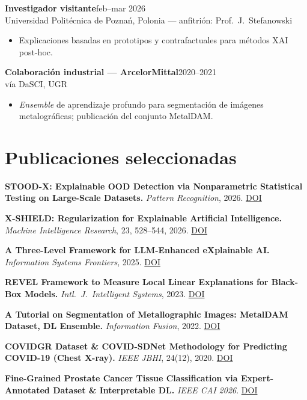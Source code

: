 \documentclass[10pt,a4paper]{article}
\newcommand{\job}[2]{\textbf{\color{ink}#1}\hfill{\footnotesize\color{muted}#2}}
\newcommand{\where}[1]{{\footnotesize\color{muted}#1}}
\begin{document}
\vspace{0.2em}
\job{Investigador visitante}{feb--mar 2026}\\
\where{Universidad Politécnica de Poznań, Polonia --- anfitrión: Prof.~J.~Stefanowski}
\begin{itemize}
  \item Explicaciones basadas en prototipos y contrafactuales para métodos XAI post-hoc.
\end{itemize}

\vspace{0.2em}
\job{Colaboración industrial --- ArcelorMittal}{2020--2021}\\
\where{vía DaSCI, UGR}
\begin{itemize}
  \item \textit{Ensemble} de aprendizaje profundo para segmentación de imágenes metalográficas; publicación del conjunto MetalDAM.
\end{itemize}

\section*{Publicaciones seleccionadas}

{\footnotesize
\textbf{STOOD-X: Explainable OOD Detection via Nonparametric Statistical Testing on Large-Scale Datasets.} \textit{Pattern Recognition}, 2026. \href{https://doi.org/10.1016/j.patcog.2026.113254}{DOI}\par\vspace{0.25em}
\textbf{X-SHIELD: Regularization for Explainable Artificial Intelligence.} \textit{Machine Intelligence Research}, 23, 528--544, 2026. \href{https://doi.org/10.1007/s11633-025-1576-y}{DOI}\par\vspace{0.25em}
\textbf{A Three-Level Framework for LLM-Enhanced eXplainable AI.} \textit{Information Systems Frontiers}, 2025. \href{https://doi.org/10.1007/s10796-025-10668-1}{DOI}\par\vspace{0.25em}
\textbf{REVEL Framework to Measure Local Linear Explanations for Black-Box Models.} \textit{Intl.~J.~Intelligent Systems}, 2023. \href{https://doi.org/10.1155/2023/8068569}{DOI}\par\vspace{0.25em}
\textbf{A Tutorial on Segmentation of Metallographic Images: MetalDAM Dataset, DL Ensemble.} \textit{Information Fusion}, 2022. \href{https://doi.org/10.1016/j.inffus.2021.09.018}{DOI}\par\vspace{0.25em}
\textbf{COVIDGR Dataset \& COVID-SDNet Methodology for Predicting COVID-19 (Chest X-ray).} \textit{IEEE JBHI}, 24(12), 2020. \href{https://doi.org/10.1109/JBHI.2020.3037127}{DOI}\par\vspace{0.25em}
\textbf{Fine-Grained Prostate Cancer Tissue Classification via Expert-Annotated Dataset \& Interpretable DL.} \textit{IEEE CAI 2026}. \href{https://doi.org/10.1109/CAI68641.2026.11536250}{DOI}
\par}
\end{document}
